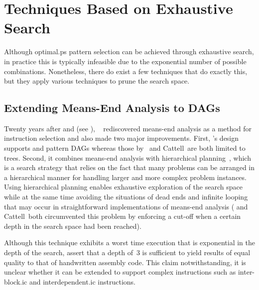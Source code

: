 \section{Techniques Based on Exhaustive Search}

Although \gls{optimal.ps} \gls{pattern selection} can be achieved through
exhaustive search, in practice this is typically infeasible due to the
exponential number of possible combinations.
%
Nonetheless, there do exist a few techniques that do exactly this, but they
apply various techniques to prune the search space.


\subsection{Extending Means-End Analysis to DAGs}

Twenty years after \citeauthor{Newcomer:1975} and \citeauthor{CattellEtAl:1979}
(see ),
\citeauthor{YuHu:1994a}~\cite{YuHu:1994a, YuHu:1994b} rediscovered
\gls{means-end analysis} as a method for \gls{instruction selection} and also
made two major improvements.
%
First, \citeauthor{YuHu:1994a}'s design supports  and
\glspl{pattern DAG} whereas those by~\citeauthor{Newcomer:1975} and
Cattell~\etal are both limited to \glspl{tree}.
%
Second, it combines \gls{means-end analysis} with \gls{hierarchical
  planning}~\cite{Sacerdoti:1973}, which is a \gls{search} strategy that relies
on the fact that many problems can be arranged in a hierarchical manner for
handling larger and more complex problem instances.
%
Using hierarchical planning enables exhaustive exploration of the search space
while at the same time avoiding the situations of dead ends and infinite looping
that may occur in straightforward implementations of \gls{means-end analysis}
(\citeauthor{Newcomer:1975} and Cattell~\etal both circumvented this problem by
enforcing a cut-off when a certain depth in the search space had been reached).

Although this technique exhibits a worst time execution that is exponential in
the depth of the search, \citeauthor{YuHu:1994a} assert that a depth of~3 is
sufficient to yield results of equal quality to that of handwritten
\gls{assembly code}.
%
This claim notwithstanding, it is unclear whether it can be extended to support
complex \glspl{instruction} such as \gls{inter-block.ic} and
\gls{interdependent.ic} \glspl{instruction}.


